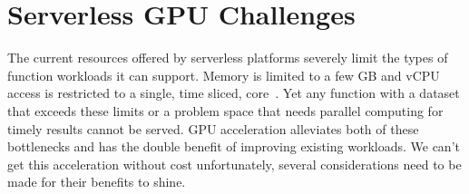 \section{Serverless GPU Challenges}
\label{sec:motiv}

The current resources offered by serverless platforms severely limit the types of function workloads it can support.
Memory is limited to a few GB and vCPU access is restricted to a single, time sliced, core~\cite{lambda-limits}.
Yet any function with a dataset that exceeds these limits or a problem space that needs parallel computing for timely results cannot be served.
GPU acceleration alleviates both of these bottlenecks and has the double benefit of improving existing workloads. 
We can't get this acceleration without cost unfortunately, several considerations need to be made for their benefits to shine.

